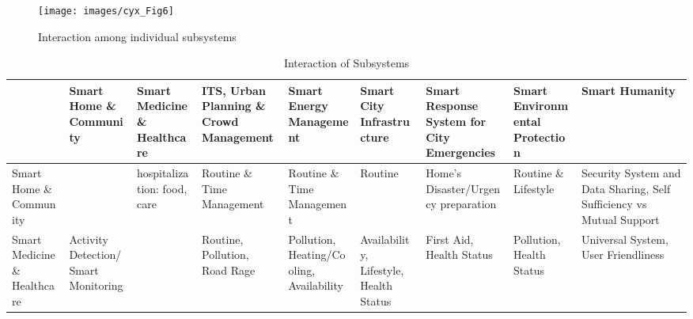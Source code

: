 \documentclass[letterpaper, twocolumn, 10pt, conference]{IEEEtran}
\begin{document}
\begin{figure}[h!]
        \centering
        \texttt{[image: images/cyx\_Fig6]}
        \caption{Interaction among individual subsystems}
        \label{fig:cyx:subsystem-interaction}
\end{figure}

\renewcommand{\tabularxcolumn}[1]{>{\small}m{#1}}
\renewcommand{\arraystretch}{1.2}

\begin{landscape}
\begin{table}[p]
        \caption{Interaction of Subsystems}
        \begin{center}
                \begin{tabularx}{1.3\textwidth}{|Y|Y|Y|Y|Y|Y|Y|Y|Y|}
                	\hline
                	                                           & Smart Home \& Community                                                  & Smart Medicine \& Healthcare                  & ITS, Urban Planning \& Crowd Management                              & Smart Energy Management                  & Smart City Infrastructure                           & Smart Response System for City Emergencies                                          & Smart Environmental Protection                         & Smart Humanity                                                       \\ \hline
                	Smart Home \& Community                    &                                                                          & hospitalization: food, care                   & Routine \& Time Management                                           & Routine \& Time Management               & Routine                                             & Home's Disaster/Urgency preparation                                                 & Routine \& Lifestyle                                   & Security System and Data Sharing, Self Sufficiency vs Mutual Support \\ \hline
                	Smart Medicine \& Healthcare               & Activity Detection/Smart Monitoring                                      &                                               & Routine, Pollution, Road Rage                                        & Pollution, Heating/Cooling, Availability & Availability, Lifestyle, Health Status              & First Aid, Health Status                                                            & Pollution, Health Status                               & Universal System, User Friendliness                                  \\ \hline

\end{tabularx}
\end{center}
\end{table}
\end{landscape}
\end{document}
